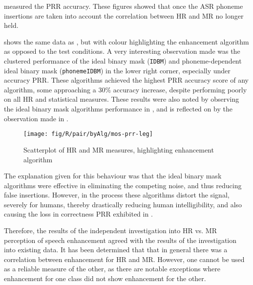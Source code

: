  measured the \ac{PRR} accuracy.
These figures showed that once the \ac{ASR} phoneme insertions are
taken into account the correlation between \ac{HR} and \ac{MR} no
longer held.

 shows the same data as ,
but with colour highlighting the enhancement algorithm as opposed
to the test conditions. A very interesting observation made was the
clustered performance of the ideal binary mask (\lstinline!IDBM!)
and phoneme-dependent ideal binary mask (\lstinline!phonemeIDBM!)
in the lower right corner, especially under accuracy \ac{PRR}. These
algorithms achieved the highest \ac{PRR} accuracy score of any algorithm,
some approaching a 30\% accuracy increase, despite performing poorly
on all \ac{HR} and statistical measures. These results were also
noted by observing the ideal binary mask algorithms performance in
, and is reflected on by the
observation made in .

\begin{figure}[h]

\noindent \begin{centering}
\texttt{[image: fig/R/pair/byAlg/mos-prr-leg]}
\par\end{centering}

\protect\caption{\label{fig:hr-mr-alg}Scatterplot of \acs{HR} and \acs{MR} measures,
highlighting enhancement algorithm}
\end{figure}


The explanation given for this behaviour was that the ideal binary
mask algorithms were effective in eliminating the competing noise,
and thus reducing false insertions. However, in the process these
algorithms distort the signal, severely for humans, thereby drastically
reducing human intelligibility, and also causing the loss in correctness
\ac{PRR} exhibited in .

Therefore, the results of the independent investigation into \ac{HR}
vs. \ac{MR} perception of speech enhancement agreed with the results
of the investigation into existing data. It has been determined that
that in general there was a correlation between enhancement for \ac{HR}
and \ac{MR}. However, one cannot be used as a reliable measure of
the other, as there are notable exceptions where enhancement for one
class did not show enhancement for the other.

